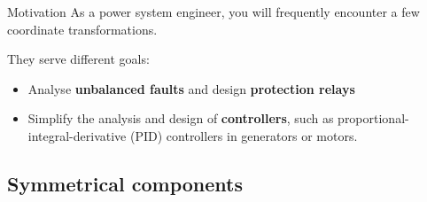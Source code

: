 \begin{frame}{Motivation}
    As a power system engineer, you will frequently encounter a few coordinate transformations.

    They serve different goals:
    \begin{itemize}
        \item Analyse \textbf{unbalanced faults} and design \textbf{protection relays}
        \item Simplify the analysis and design of \textbf{controllers}, such as proportional-integral-derivative (PID) controllers in generators or motors.
    \end{itemize}

\end{frame}

\subsection{Symmetrical components}


